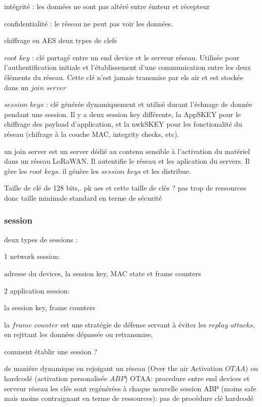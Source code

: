 \documentclass[12pt,a4paper,oneside, titlepage]{report}
\begin{document}
intégrité : les données ne sont pas altéré entre émteur et récepteur

confidentialité : le réseau ne peut pas voir les données.

chiffrage en AES
deux types de clefs

$root$ $key$ : clé partagé entre un end device et le serveur réseau. Utilisée pour l'authentification initiale et l'établissement d'une communication entre les deux éléments du réseau. Cette clé n'est jamais transmise par els air et est stockée dans un $join$ $server$

$session$ $keys$ : clé générée dynamiquement et utilisé durant l'échnage de donnée pendant une session. Il y a deux session key différente, la AppSKEY pour le chiffrage des payload d'application, et la nwkSKEY pour les fonctionalité du réseau (chifrage à la couche MAC, integrity checks, etc).

un join server est un server dédié au contenu sensible à l'activation du matériel dans un réseau LoRaWAN. Il autentifie le réseau et les aplication du servers. Il gère les $root$ $keys$. il génère les $session$ $keys$ et les distribue.

Taille de clé de 128 bits,.
pk aes et cette taille de clés ? pas trop de ressources donc taille minimale standard en terme de sécurité

\subsubsection{session}

deux types de sessions :

1 network session:

adresse du devices, la session key, MAC state et frame counters

2 application session:

la session key, frame counters

la $frame$ $counter$ est une stratégie de défense servant à éviter les $replay$ $attacks$, en rejttant les données dépassée ou retransmise. 


comment établir une session ?

de manière dynamique en rejoigant un réseau (Over the air Activation $OTAA$) ou hardcodé (activation personalisée $ABP$)
OTAA:
procedure entre end devices et serveur réseau
les clés sont regénérées à chaque nouvelle session
ABP (moins safe mais moins contraignant en terme de ressources):
pas de procédure
clé hardcodé


\newpage
\end{document}
